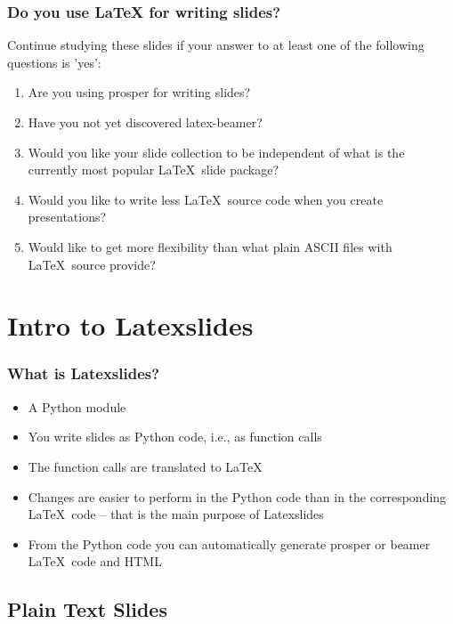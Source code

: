 \documentclass{beamer}
\begin{document}
\begin{frame} %

\frametitle{Do you use \LaTeX{} for writing slides?}
Continue studying these slides if your answer to at least one of
the following questions is 'yes':
\begin{enumerate}
\item Are you using prosper for writing slides?
\item Have you not yet discovered latex-beamer?
\item Would you like your slide collection to be independent of what
is the currently most popular \LaTeX~slide package?
\item Would you like to write less \LaTeX~source code when you
create presentations?
\item Would like to get more flexibility than what plain ASCII
files with \LaTeX~source provide?
\end{enumerate}
\end{frame}


\section[Intro]{Intro to Latexslides}


\begin{frame}
\frametitle{What is Latexslides?}

\begin{block}

\begin{itemize}
\item A Python module
\item You write slides as Python code, i.e., as function calls
\item The function calls are translated to \LaTeX
\item Changes are easier to perform in the Python code than in the corresponding \LaTeX~code -- that is the main purpose of Latexslides
\item From the Python code you can automatically generate prosper or beamer \LaTeX~code and HTML
\end{itemize}

\end{block}

\end{frame}

\subsection[Text]{Plain Text Slides}
\end{document}
